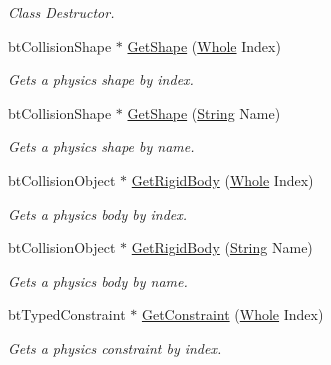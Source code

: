 \begin{DoxyCompactItemize}
\begin{DoxyCompactList}\small\item\em Class Destructor. \item\end{DoxyCompactList}\item 
btCollisionShape $\ast$ \hyperlink{classphys_1_1internal_1_1BulletFile_ad98701ff57511b91d065ce30cc0c8db7}{GetShape} (\hyperlink{namespacephys_a460f6bc24c8dd347b05e0366ae34f34a}{Whole} Index)
\begin{DoxyCompactList}\small\item\em Gets a physics shape by index. \item\end{DoxyCompactList}\item 
btCollisionShape $\ast$ \hyperlink{classphys_1_1internal_1_1BulletFile_a9786392b58a7c591bfa58f74dde4b914}{GetShape} (\hyperlink{namespacephys_aa03900411993de7fbfec4789bc1d392e}{String} Name)
\begin{DoxyCompactList}\small\item\em Gets a physics shape by name. \item\end{DoxyCompactList}\item 
btCollisionObject $\ast$ \hyperlink{classphys_1_1internal_1_1BulletFile_a4c489fe604a139dcba9048b7b38ca385}{GetRigidBody} (\hyperlink{namespacephys_a460f6bc24c8dd347b05e0366ae34f34a}{Whole} Index)
\begin{DoxyCompactList}\small\item\em Gets a physics body by index. \item\end{DoxyCompactList}\item 
btCollisionObject $\ast$ \hyperlink{classphys_1_1internal_1_1BulletFile_a0eaf586c53e740d31e9cad0cac8d5f6d}{GetRigidBody} (\hyperlink{namespacephys_aa03900411993de7fbfec4789bc1d392e}{String} Name)
\begin{DoxyCompactList}\small\item\em Gets a physics body by name. \item\end{DoxyCompactList}\item 
btTypedConstraint $\ast$ \hyperlink{classphys_1_1internal_1_1BulletFile_afa7216bc72f6e7cddca7817f26b9b642}{GetConstraint} (\hyperlink{namespacephys_a460f6bc24c8dd347b05e0366ae34f34a}{Whole} Index)
\begin{DoxyCompactList}\small\item\em Gets a physics constraint by index. \item\end{DoxyCompactList}\item 

\end{DoxyCompactItemize}
